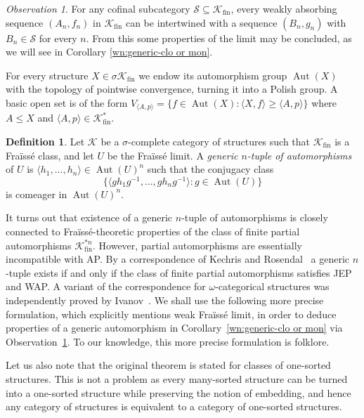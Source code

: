 \documentclass[oneside,notitlepage,12pt]{article}
\theoremstyle{definition}
\newtheorem{df}[tw]{Definition}
\theoremstyle{remark}
\newtheorem{observation}[tw]{Observation}
\newcommand \set [1]{\{#1\}}
\newcommand \seq [1]{\langle #1 \rangle}
\newcommand \Su {\mathscr{S}}
\newcommand \K {\mathscr{K}}
\newcommand \fin {{\operatorname{fin}}}
\newcommand \Aut {\operatorname{Aut}}
\begin{document}
\begin{observation} \label{obs:limit_from_cofinal}
    For any cofinal subcategory $\Su \subseteq \K_\fin$, 
    every weakly absorbing sequence $(A_n, f_n)$ in $\K_\fin$ can be intertwined with a sequence $(B_n, g_n)$ with $B_n \in \Su$ for every $n$.
    From this some properties of the limit may be concluded, as we will see in Corollary \ref{wn:generic-clo or mon}.
\end{observation}



For every structure $X \in \sigma\K_\fin$ we endow its automorphism group $\Aut(X)$ with the topology of pointwise convergence, turning it into a Polish group.
A basic open set is of the form $V_{\seq{A, p}} = \set{f \in \Aut(X) : \seq{X, f} \geq \seq{A, p}}$ where $A \leq X$ and $\seq{A, p} \in \K^*_\fin$.

\begin{df}
Let $\K$ be a $\sigma$-complete category of structures such that $\K_\fin$ is a Fraïssé class, and let $U$ be the Fraïssé limit.
A \emph{generic $n$-tuple of automorphisms} of $U$ is $\seq{h_1,\ldots, h_n}\in \Aut(U)^n$ such that the conjugacy class
\[
    \{\seq{g h_1 g^{-1},\ldots, g h_n g^{-1}}: g \in \Aut(U)\}
\]
is comeager in $\Aut(U)^n$.
\end{df}


It turns out that existence of a generic $n$-tuple of automorphisms is closely connected to Fraïssé-theoretic properties of the class of finite partial automorphisms $\K^{*n}_\fin$.
However, partial automorphisms are essentially incompatible with AP.
By a correspondence of Kechris and Rosendal~\cite[Theorem~6.2]{KR} a generic $n$-tuple exists if and only if the class of finite partial automorphisms satisfies JEP and WAP.
A variant of the correspondence for $\omega$-categorical structures was independently proved by Ivanov~\cite[Theorem~1.2]{Iv}.
We shall use the following more precise formulation, which explicitly mentions  weak Fraïssé limit, in order to deduce properties of a generic automorphism in Corollary~\ref{wn:generic-clo or mon} via Observation~\ref{obs:limit_from_cofinal}.
To our knowledge, this more precise formulation is folklore.

Let us also note that the original theorem is stated for classes of one-sorted structures. This is not a problem as every many-sorted structure can be turned into a one-sorted structure while preserving the notion of embedding, and hence any category of structures is equivalent to a category of one-sorted structures.
\end{document}

